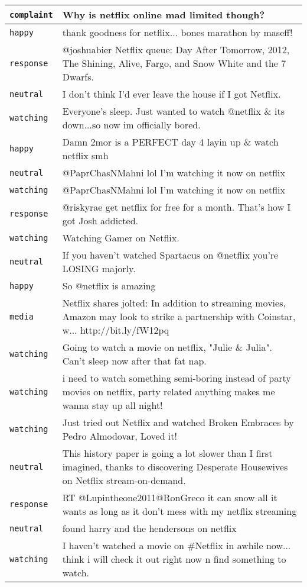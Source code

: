 {\begin{longtable}{|l|p{160mm}|}
      \tabularnewline\hline
         \texttt{complaint} & Why is netflix online mad limited though?
      \tabularnewline\hline
         \texttt{happy} & thank goodness for netflix... bones marathon by maseff!
      \tabularnewline\hline
         \texttt{response} & @joshuabier Netflix queue: Day After Tomorrow, 2012, The Shining, Alive, Fargo, and Snow White and the 7 Dwarfs.
      \tabularnewline\hline
         \texttt{neutral} & I don't think I'd ever leave the house if I got Netflix.
      \tabularnewline\hline
         \texttt{watching} & Everyone's sleep. Just wanted to watch @netflix \& its down...so now im officially bored.
      \tabularnewline\hline
         \texttt{happy} & Damn 2mor is a PERFECT day 4 layin up \& watch netflix smh
      \tabularnewline\hline
         \texttt{neutral} & @PaprChasNMahni lol I'm watching it now on netflix
      \tabularnewline\hline
         \texttt{watching} & @PaprChasNMahni lol I'm watching it now on netflix
      \tabularnewline\hline
         \texttt{response} & @riskyrae get netflix for free for a month. That's how I got Josh addicted.
      \tabularnewline\hline
         \texttt{watching} & Watching Gamer on Netflix.
      \tabularnewline\hline
         \texttt{neutral} & If you haven't watched Spartacus on @netflix you're LOSING majorly.
      \tabularnewline\hline
         \texttt{happy} & So @netflix is amazing
      \tabularnewline\hline
         \texttt{media} & Netflix shares jolted: In addition to streaming movies, Amazon may look to strike a partnership with Coinstar, w... http://bit.ly/fW12pq
      \tabularnewline\hline
         \texttt{watching} & Going to watch a movie on netflix, "Julie \& Julia". Can't sleep now after that fat nap.
      \tabularnewline\hline
         \texttt{watching} & i need to watch something semi-boring instead of party movies on netflix, party related anything makes me wanna stay up all night!
      \tabularnewline\hline
         \texttt{watching} & Just tried out Netflix and watched Broken Embraces by Pedro Almodovar, Loved it!
      \tabularnewline\hline
         \texttt{neutral} & This history paper is going a lot slower than I first imagined, thanks to discovering Desperate Housewives on Netflix stream-on-demand.
      \tabularnewline\hline
         \texttt{response} & RT @Lupintheone2011@RonGreco it can snow all it wants as long as it don't mess with my netflix streaming
      \tabularnewline\hline
         \texttt{neutral} & found harry and the hendersons on netflix
      \tabularnewline\hline
         \texttt{watching} & I haven't watched a movie on \#Netflix in awhile now... think i will check it out right now n find something to watch.

\end{longtable}}
